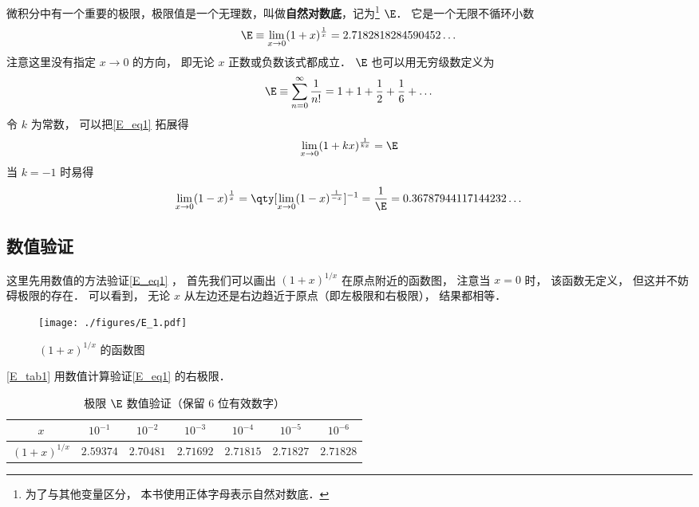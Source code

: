 
微积分中有一个重要的极限，极限值是一个无理数，叫做\textbf{自然对数底}，记为\footnote{为了与其他变量区分， 本书使用正体字母表示自然对数底．} $\E$． 它是一个无限不循环小数
\begin{equation}\label{E_eq1}
\E \equiv \lim_{x \to 0} (1 + x)^{\frac{1}{x}} = 2.7182818284590452\dots
\end{equation}
注意这里没有指定 $x\to 0$ 的方向， 即无论 $x$ 正数或负数该式都成立． $\E$ 也可以用无穷级数定义为
\begin{equation}\label{E_eq2}
\E \equiv \sum_{n=0}^\infty \frac{1}{n!} = 1 + 1 + \frac{1}{2} + \frac{1}{6} + \dots
\end{equation}
令 $k$ 为常数， 可以把\autoref{E_eq1} 拓展得
\begin{equation}\label{E_eq4}
\lim_{x \to 0} (1 + kx)^{\frac{1}{kx}} = \E
\end{equation}
当 $k = -1$ 时易得
\begin{equation}\label{E_eq3}
\lim_{x \to 0} (1 - x)^{\frac{1}{x}} = \qty[\lim_{x \to 0} (1 - x)^{\frac{1}{-x}}]^{-1} = \frac{1}{\E} = 0.36787944117144232\dots
\end{equation}

\subsection{数值验证}
这里先用数值的方法验证\autoref{E_eq1} ， 首先我们可以画出 $(1+x)^{1/x}$ 在原点附近的函数图， 注意当 $x = 0$ 时， 该函数无定义， 但这并不妨碍极限的存在． 可以看到， 无论 $x$ 从左边还是右边趋近于原点（即左极限和右极限）， 结果都相等．
\begin{figure}[ht]
\centering
\texttt{[image: ./figures/E\_1.pdf]}
\caption{$(1+x)^{1/x}$ 的函数图} \label{E_fig1}
\end{figure}

\autoref{E_tab1} 用数值计算验证\autoref{E_eq1} 的右极限．
\begin{table}[ht]
\centering
\caption{极限 $\E$ 数值验证（保留 6 位有效数字）}\label{E_tab1}
\begin{tabular}{|c|c|c|c|c|c|c|}
\hline
$x$ & $10^{-1}$ & $10^{-2}$ & $10^{-3}$ & $10^{-4}$ & $10^{-5}$ & $10^{-6}$ \\
\hline
$(1 + x)^{1/x}$ & $2.59374$ & $2.70481$ & $2.71692$ & $2.71815$ & $2.71827$ & $2.71828$ \\
\hline
\end{tabular}
\end{table}

